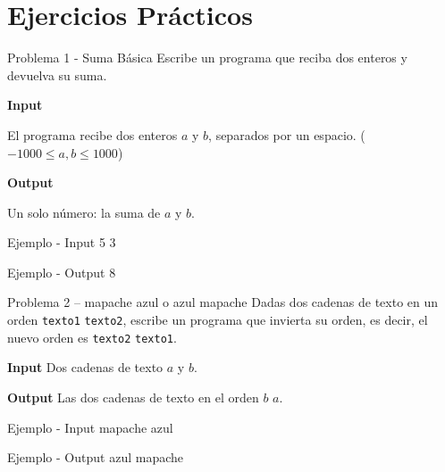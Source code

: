 \documentclass{article}
\begin{document}
\section{Ejercicios Prácticos}


\begin{container}{Problema 1 - Suma Básica}
Escribe un programa que reciba dos enteros y devuelva su suma.   
\end{container}

\textbf{Input}

El programa recibe dos enteros $a$ y $b$, separados por un espacio. ($-1000 \leq a, b \leq 1000$)

\vspace{0.5em}
\textbf{Output}

Un solo número: la suma de $a$ y $b$.

\vspace{0.5em}

\begin{container}{Ejemplo - Input}
5 3
\end{container}

\begin{container}{Ejemplo - Output}
8
\end{container}

\vspace{3.5em}


\begin{container}{Problema 2 – mapache azul o azul mapache}
Dadas dos cadenas de texto en un orden \texttt{texto1} \texttt{texto2}, escribe un programa que invierta su orden, es decir, el nuevo orden es \texttt{texto2} \texttt{texto1}.
\end{container}

\textbf{Input}
Dos cadenas de texto $a$ y $b$.

\vspace{0.5em}
\textbf{Output}
Las dos cadenas de texto en el orden $b$ $a$.


\vspace{0.5em}

\begin{container}{Ejemplo - Input}
mapache azul
\end{container}


\begin{container}{Ejemplo - Output}
azul mapache
\end{container}

\vspace{3.5em}
\end{document}
